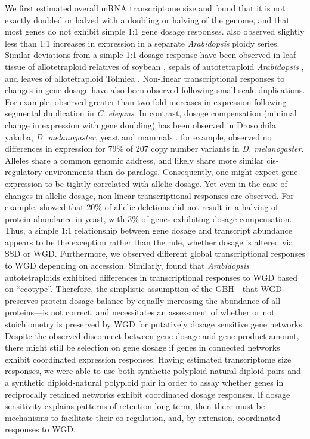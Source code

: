 \documentclass[11pt]{article}
\begin{document}
We first estimated overall mRNA transcriptome size and found that it is not exactly doubled or halved with a doubling or halving of the genome, and that most genes do not exhibit simple 1:1 gene dosage responses.
\cite{hou2018} also observed slightly less than 1:1 increases in expression in a separate \textit{Arabidopsis} ploidy series.
Similar deviations from a simple 1:1 dosage response have been observed in leaf tissue of allotetraploid relatives of soybean \citep{coate2010}, sepals of autotetraploid \textit{Arabidopsis} \citep{robinson2018}, and leaves of allotetraploid Tolmiea \citep{visger2019}.
Non-linear transcriptional responses to changes in gene dosage have also been observed following small scale duplications.
For example, \cite{konrad2018} observed greater than two-fold increases in expression following segmental duplication in \textit{C. elegans}.
In contrast, dosage compensation (minimal change in expression with gene doubling) has been observed in Drosophila yakuba, \textit{D. melanogaster}, yeast and mammals \citep{qian2010, rogers2017, zhou2011}.
\cite{zhou2011} for example, observed no differences in expression for 79\% of 207 copy number variants in \textit{D. melanogaster}.\\

Alleles share a common genomic address, and likely share more similar cis-regulatory environments than do paralogs.
Consequently, one might expect gene expression to be tightly correlated with allelic dosage.
Yet even in the case of changes in allelic dosage, non-linear transcriptional responses are observed.
For example, \cite{springer2010} showed that 20\% of allelic deletions did not result in a halving of protein abundance in yeast, with 3\% of genes exhibiting dosage compensation.
Thus, a simple 1:1 relationship between gene dosage and transcript abundance appears to be the exception rather than the rule, whether dosage is altered via SSD or WGD.
Furthermore, we observed different global transcriptional responses to WGD depending on accession.
Similarly, \cite{yu2010} found that \textit{Arabidopsis} autotetraploids exhibited differences in transcriptional responses to WGD based on ``ecotype''.
Therefore, the simplistic assumption of the GBH---that WGD preserves protein dosage balance by equally increasing the abundance of all proteins---is not correct, and necessitates an assessment of whether or not stoichiometry is preserved by WGD for putatively dosage sensitive gene networks.\\

Despite the observed disconnect between gene dosage and gene product amount, there might still be selection on gene dosage if genes in connected networks exhibit coordinated expression responses.
Having estimated transcriptome size responses, we were able to use both synthetic polyploid-natural diploid pairs and a synthetic diploid-natural polyploid pair in order to assay whether genes in reciprocally retained networks exhibit coordinated dosage responses.
If dosage sensitivity explains patterns of retention long term, then there must be mechanisms to facilitate their co-regulation\citep{papp2003}, and, by extension, coordinated responses to WGD.\\
\end{document}
